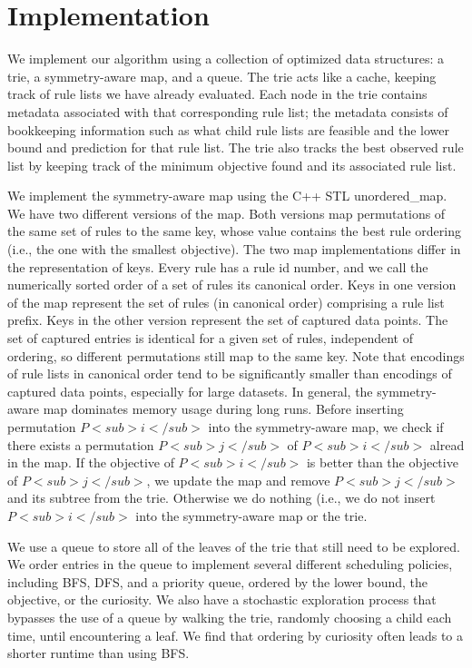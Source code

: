 \section{Implementation}
\label{sec:implementation}

We implement our algorithm using a collection of optimized data structures:
a trie, a symmetry-aware map, and a queue.
The trie acts like a cache, keeping track of rule lists we have already evaluated.
Each node in the trie contains metadata associated with that corresponding rule list;
the metadata consists of bookkeeping information such as what child rule lists are feasible and
the lower bound and prediction for that rule list.
The trie also tracks the best observed rule list by keeping track of the minimum objective
found and its associated rule list.

We implement the symmetry-aware map using the C++ STL unordered\_map.
We have two different versions of the map.
Both versions map permutations of the same set of rules to the same key, whose value
contains the best rule ordering (i.e., the one with the smallest objective).
The two map implementations differ in the representation of keys.
Every rule has a rule id number, and we call the numerically sorted order of a set of rules its
canonical order.
Keys in one version of the map represent the set of rules (in canonical order) comprising a
rule list prefix.
Keys in the other version represent the set of captured data points.
The set of captured entries is identical for a given set of rules, independent of ordering, so
different permutations still map to the same key.
%
Note that encodings of rule lists in canonical order tend to be
significantly smaller than encodings of captured data points,
especially for large datasets.
%
In general, the symmetry-aware map dominates memory usage during long runs.
Before inserting permutation $P<sub>i</sub>$ into the symmetry-aware map, we check
if there exists a permutation $P<sub>j</sub>$ of $P<sub>i</sub>$ alread in the map.
If the objective of $P<sub>i</sub>$ is better than the objective of $P<sub>j</sub>$,
we update the map and remove $P<sub>j</sub>$ and its subtree from the trie.
Otherwise we do nothing (i.e., we do not insert $P<sub>i</sub>$ into the symmetry-aware map
or the trie.

We use a queue to store all of the leaves of the trie that still need to be explored.
We order entries in the queue to implement several different scheduling policies,
including BFS, DFS, and a priority queue, ordered by the lower bound, the objective, or the
curiosity.
We also have a stochastic exploration process that bypasses the use of a queue by walking
the trie, randomly choosing a child each time, until encountering a leaf.
We find that ordering by curiosity often leads to a shorter runtime than using BFS.


